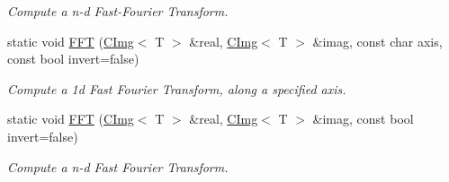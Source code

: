 \begin{DoxyCompactItemize}
\begin{DoxyCompactList}\small\item\em Compute a n-\/d Fast-\/Fourier Transform. \item\end{DoxyCompactList}\item 
\hypertarget{structcimg__library_1_1CImg_a949ac315fc855dd9e5ac3377d19b01b2}{
static void \hyperlink{structcimg__library_1_1CImg_a949ac315fc855dd9e5ac3377d19b01b2}{FFT} (\hyperlink{structcimg__library_1_1CImg}{CImg}$<$ T $>$ \&real, \hyperlink{structcimg__library_1_1CImg}{CImg}$<$ T $>$ \&imag, const char axis, const bool invert=false)}
\label{structcimg__library_1_1CImg_a949ac315fc855dd9e5ac3377d19b01b2}

\begin{DoxyCompactList}\small\item\em Compute a 1d Fast Fourier Transform, along a specified axis. \item\end{DoxyCompactList}\item 
\hypertarget{structcimg__library_1_1CImg_aab0887ae7c3bd1571ea7ccc4a8cac3f6}{
static void \hyperlink{structcimg__library_1_1CImg_aab0887ae7c3bd1571ea7ccc4a8cac3f6}{FFT} (\hyperlink{structcimg__library_1_1CImg}{CImg}$<$ T $>$ \&real, \hyperlink{structcimg__library_1_1CImg}{CImg}$<$ T $>$ \&imag, const bool invert=false)}
\label{structcimg__library_1_1CImg_aab0887ae7c3bd1571ea7ccc4a8cac3f6}

\begin{DoxyCompactList}\small\item\em Compute a n-\/d Fast Fourier Transform. \item\end{DoxyCompactList}\end{DoxyCompactItemize}
